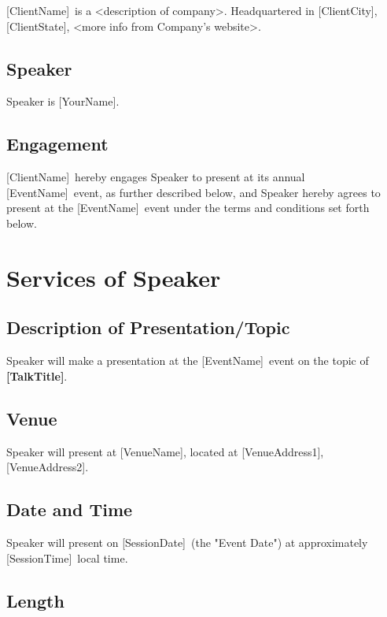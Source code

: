 \documentclass[a4paper,12pt]{article} %
\newcommand{\YourName}{[YourName]}
\newcommand{\TalkTitle}{[TalkTitle]}
\newcommand{\ClientName}{[ClientName]}
\newcommand{\ClientCity}{[ClientCity]}
\newcommand{\ClientState}{[ClientState]}
\newcommand{\EventName}{[EventName]}
\newcommand{\SessionDate}{[SessionDate]}
\newcommand{\SessionTime}{[SessionTime]}
\newcommand{\VenueName}{[VenueName]}
\newcommand{\VenueAddressLineOne}{[VenueAddress1]}
\newcommand{\VenueAddressAddressLineTwo}{[VenueAddress2]}
\begin{document}
\ClientName ~is a <description of company>. Headquartered in \ClientCity, \ClientState, <more info from Company's website>.

\subsection{Speaker}

Speaker is \YourName.

\subsection{Engagement}

\ClientName ~hereby engages Speaker to present at its annual \EventName ~event, as further described below, and Speaker hereby agrees to present at the \EventName ~event under the terms and conditions set forth below.


\section{Services of Speaker}

\subsection{Description of Presentation/Topic}

Speaker will make a presentation at the \EventName ~event on the topic of \textbf{\TalkTitle}.

\subsection{Venue}

Speaker will present at \VenueName, located at \VenueAddressLineOne, \VenueAddressAddressLineTwo.

\subsection{Date and Time}

Speaker will present on \SessionDate ~(the "Event Date") at approximately \SessionTime ~local time.

\subsection{Length}
\end{document}
